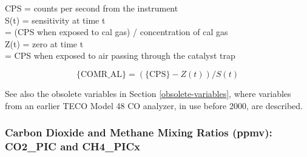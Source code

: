 \documentclass[
]{book}
\begin{document}
CPS = counts per second from the instrument\\
S(t) = sensitivity
at time t\\
\hspace*{0.333em}\hspace*{0.333em}\hspace*{0.333em}\hspace*{0.333em}\hspace*{0.333em}\hspace*{0.333em}\hspace*{0.333em}= (CPS when exposed to cal gas) / concentration of cal gas\\
Z(t) = zero at time t\\
\hspace*{0.333em}\hspace*{0.333em}\hspace*{0.333em}\hspace*{0.333em}\hspace*{0.333em}\hspace*{0.333em}\hspace*{0.333em}= CPS when exposed to air passing through the catalyst trap

\begin{equation}
\mathrm{\{COMR\_AL\}} = (\mathrm{\{CPS\}}-Z(t))/S(t)
\label{eq:COMRbox}
\end{equation}

See also the obsolete variables in Section \ref{obsolete-variables}, where variables from an earlier TECO Model 48 CO analyzer, in use before 2000, are described.

\hypertarget{co2-pic}{%
\subsubsection*{Carbon Dioxide and Methane Mixing Ratios (ppmv): CO2\_PIC and CH4\_PICx}\label{co2-pic}}
\end{document}
